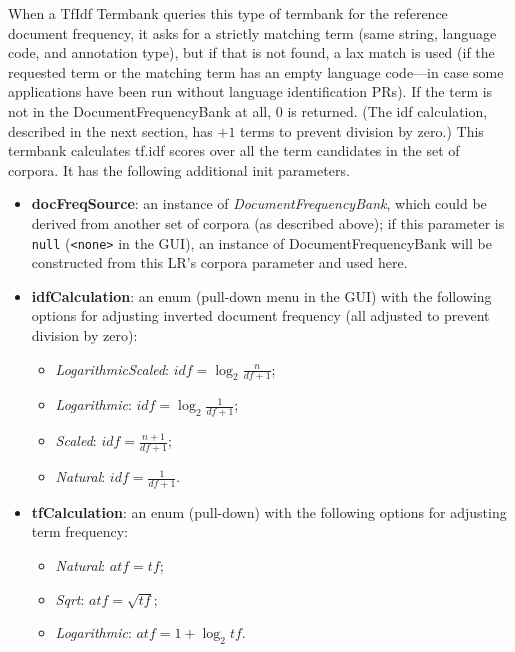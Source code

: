 When a TfIdf Termbank queries this type of termbank for the reference document
frequency, it asks for a strictly matching term (same string, language code, and
annotation type), but if that is not found, a lax match is used (if the
requested term or the matching term has an empty language code---in case some
applications have been run without language identification PRs).  If the term is
not in the DocumentFrequencyBank at all, 0 is returned.  (The idf calculation,
described in the next section, has $+1$ terms to prevent division by zero.)
This termbank calculates tf.idf scores over all the term candidates in the set
of corpora.  It has the following additional init parameters.
\begin{itemize}
\item \textbf{docFreqSource}: an instance of \emph{DocumentFrequencyBank}, which
  could be derived from another set of corpora (as described above); if this
  parameter is \texttt{null} (\verb!<none>! in the GUI), an instance of
  DocumentFrequencyBank will be constructed from this LR's corpora parameter and
  used here.
\item \textbf{idfCalculation}: an enum (pull-down menu in the GUI) with the
  following options for adjusting inverted document frequency (all adjusted to
  prevent division by zero):
  \begin{itemize}
  \item \emph{LogarithmicScaled}: $\mathit{idf}=\log_{2}\frac{n}{\mathit{df}+1}$;
  \item \emph{Logarithmic}: $\mathit{idf}=\log_{2}\frac{1}{\mathit{df}+1}$;
  \item \emph{Scaled}: $\mathit{idf}=\frac{n+1}{\mathit{df}+1}$;
  \item \emph{Natural}: $\mathit{idf}=\frac{1}{\mathit{df}+1}$.
  \end{itemize}
\item \textbf{tfCalculation}: an enum (pull-down) with the following options for
  adjusting term frequency:
  \begin{itemize}
  \item \emph{Natural}: $\mathit{atf}=\mathit{tf}$;
  \item \emph{Sqrt}: $\mathit{atf}=\sqrt{\mathit{tf}}$;
  \item \emph{Logarithmic}: $\mathit{atf}=1+\log_{2} \mathit{tf}$.
  \end{itemize}

\end{itemize}
